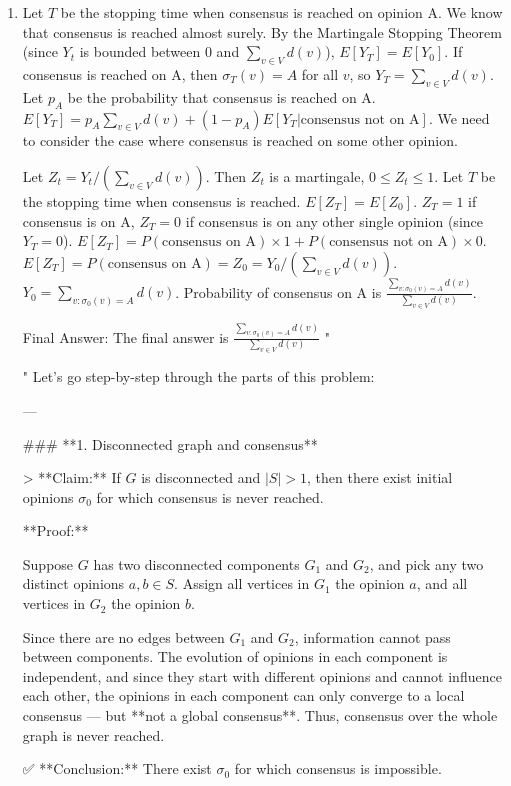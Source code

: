 \begin{enumerate}
\begin{shaded}
\begin{enumerate}
\item {} Let $T$ be the stopping time when consensus is reached on opinion A. We know that consensus is reached almost surely. By the Martingale Stopping Theorem (since $Y_t$ is bounded between 0 and $\sum_{v \in V} d(v)$), $E[Y_T] = E[Y_0]$.
If consensus is reached on A, then $\sigma_T(v) = A$ for all $v$, so $Y_T = \sum_{v \in V} d(v)$.
Let $p_A$ be the probability that consensus is reached on A.
$E[Y_T] = p_A \sum_{v \in V} d(v) + (1-p_A) E[Y_T | \text{consensus not on A}]$.
We need to consider the case where consensus is reached on some other opinion.

Let $Z_t = Y_t / (\sum_{v \in V} d(v))$. Then $Z_t$ is a martingale, $0 \le Z_t \le 1$.
Let $T$ be the stopping time when consensus is reached. $E[Z_T] = E[Z_0]$.
$Z_T = 1$ if consensus is on A, $Z_T = 0$ if consensus is on any other single opinion (since $Y_T = 0$).
$E[Z_T] = P(\text{consensus on A}) \times 1 + P(\text{consensus not on A}) \times 0$.
$E[Z_T] = P(\text{consensus on A}) = Z_0 = Y_0 / (\sum_{v \in V} d(v))$.
$Y_0 = \sum_{v: \sigma_0(v) = A} d(v)$.
Probability of consensus on A is $\frac{\sum_{v: \sigma_0(v) = A} d(v)}{\sum_{v \in V} d(v)}$.

Final Answer: The final answer is $\boxed{\frac{\sum_{v: \sigma_0(v) = A} d(v)}{\sum_{v \in V} d(v)}}$
"

"
Let's go step-by-step through the parts of this problem:

---

### **1. Disconnected graph and consensus**

> **Claim:** If \( G \) is disconnected and \( |S| > 1 \), then there exist initial opinions \( \sigma_0 \) for which consensus is never reached.

**Proof:**

Suppose \( G \) has two disconnected components \( G_1 \) and \( G_2 \), and pick any two distinct opinions \( a, b \in S \). Assign all vertices in \( G_1 \) the opinion \( a \), and all vertices in \( G_2 \) the opinion \( b \).

Since there are no edges between \( G_1 \) and \( G_2 \), information cannot pass between components. The evolution of opinions in each component is independent, and since they start with different opinions and cannot influence each other, the opinions in each component can only converge to a local consensus — but **not a global consensus**. Thus, consensus over the whole graph is never reached.

✅ **Conclusion:** There exist \( \sigma_0 \) for which consensus is impossible.


\end{enumerate}
\end{shaded}
\end{enumerate}

